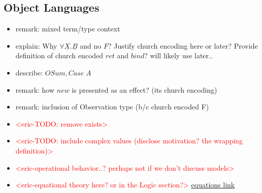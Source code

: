\documentclass[acmsmall]{acmart}
\newcommand{\eric}[1]{\textcolor{red}{ <eric-#1> }}
\begin{document}
\subsection{Object Languages}\label{sec:ObjLang}
\begin{itemize}
  \item remark: mixed term/type context
  \item explain: Why $\forall \underline{X}.\underline{B}$ and no $F$? Justify church encoding here or later? Provide definition of church encoded $ret$ and $bind$? will likely use later.. 
  \item describe: $OSum,Case\;A$
  \item remark: how $new$ is presented as an effect? (its church encoding)
  \item remark: inclusion of Observation type (b/c church encoded F)
  \item \eric{TODO: remove exists}
  \item \eric{TODO: include complex values (disclose motivation? the wrapping definition)}
  \item \eric{operational behavior..? perhaps not if we don't discuss models}
  \item \eric{equational theory here? or in the Logic section?} \href{https://publish.obsidian.md/2025/PhD/Shared/Parametricity+Logic/Result/Object+Language#Equational+Theory}{equations link}
\end{itemize}
\end{document}
